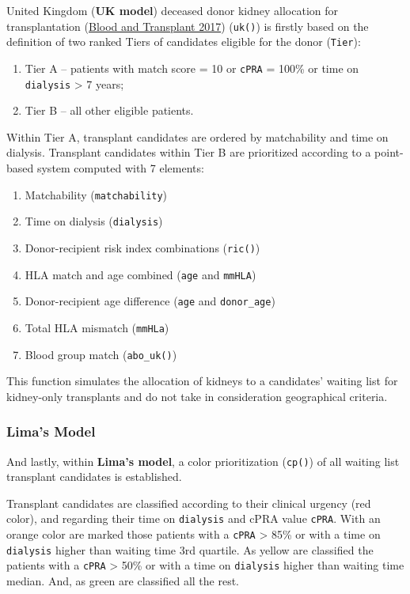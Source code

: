\documentclass[
]{article}
\providecommand{\tightlist}{%
  \setlength{\itemsep}{0pt}\setlength{\parskip}{0pt}}
\begin{document}
United Kingdom (\textbf{UK model}) deceased donor kidney allocation for
transplantation (\protect\hyperlink{ref-UK}{Blood and Transplant 2017})
(\texttt{uk()}) is firstly based on the definition of two ranked Tiers
of candidates eligible for the donor (\texttt{Tier}):

\begin{enumerate}
\def\labelenumi{\arabic{enumi}.}
\tightlist
\item
  Tier A -- patients with match score = 10 or \texttt{cPRA} = 100\% or
  time on \texttt{dialysis} \textgreater{} 7 years;
\item
  Tier B -- all other eligible patients.
\end{enumerate}

Within Tier A, transplant candidates are ordered by matchability and
time on dialysis. Transplant candidates within Tier B are prioritized
according to a point-based system computed with 7 elements:

\begin{enumerate}
\def\labelenumi{\arabic{enumi}.}
\tightlist
\item
  Matchability (\texttt{matchability})
\item
  Time on dialysis (\texttt{dialysis})
\item
  Donor-recipient risk index combinations (\texttt{ric()})
\item
  HLA match and age combined (\texttt{age} and \texttt{mmHLA})
\item
  Donor-recipient age difference (\texttt{age} and \texttt{donor\_age})
\item
  Total HLA mismatch (\texttt{mmHLa})
\item
  Blood group match (\texttt{abo\_uk()})
\end{enumerate}

This function simulates the allocation of kidneys to a candidates'
waiting list for kidney-only transplants and do not take in
consideration geographical criteria.

\hypertarget{limas-model}{%
\subsubsection{Lima's Model}\label{limas-model}}

And lastly, within \textbf{Lima's model}, a color prioritization
(\texttt{cp()}) of all waiting list transplant candidates is
established.

Transplant candidates are classified according to their clinical urgency
(red color), and regarding their time on \texttt{dialysis} and cPRA
value \texttt{cPRA}. With an orange color are marked those patients with
a \texttt{cPRA} \textgreater{} 85\% or with a time on \texttt{dialysis}
higher than waiting time 3rd quartile. As yellow are classified the
patients with a \texttt{cPRA} \textgreater{} 50\% or with a time on
\texttt{dialysis} higher than waiting time median. And, as green are
classified all the rest.
\end{document}
